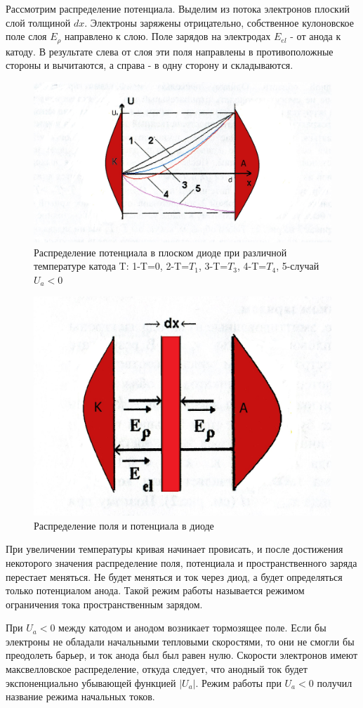 Рассмотрим распределение потенциала. Выделим из потока электронов плоский слой толщиной $dx$. Электроны заряжены отрицательно, собственное кулоновское поле слоя $E_{\rho}$ направлено к слою. Поле зарядов на электродах $E_{el}$ - от анода к катоду. В результате слева от слоя эти поля направлены в противоположные стороны и вычитаются, а справа - в одну сторону и складываются. 
\begin{figure}[h!]
	\centering
	\includegraphics[width=0.5\linewidth]{fig/img8063.jpg}
	\caption{Распределение потенциала в плоском диоде при различной температуре катода T: 1-T=0, 2-T=$T_1$, 3-T=$T_3$, 4-T=$T_4$, 5-случай $U_a<0$}
	\label{fig:2}
\end{figure}
\begin{figure}[h!]
	\centering
	\includegraphics[width=0.5\linewidth]{fig/img8064.jpg}
	\caption{Распределение поля и потенциала в диоде}
	\label{fig:3}
\end{figure}

При увеличении температуры кривая начинает провисать, и после достижения некоторого значения распределение поля, потенциала и пространственного заряда перестает меняться. Не будет меняться и ток через диод, а будет определяться только потенциалом анода. Такой режим работы называется режимом ограничения тока пространственным зарядом. 

При $U_a<0$ между катодом и анодом возникает тормозящее поле. Если бы электроны не обладали начальными тепловыми скоростями, то они не смогли бы преодолеть барьер, и ток анода был был равен нулю. Скорости электронов имеют максвелловское распределение, откуда следует, что анодный ток будет экспоненциально убывающей функцией $|U_a|$. Режим работы при $U_a<0$ получил название режима начальных токов.

